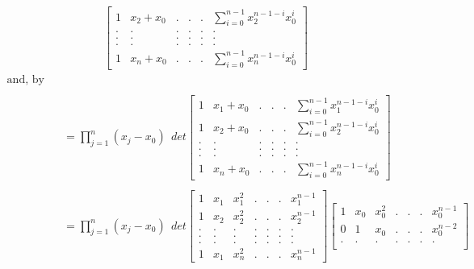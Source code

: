 \documentclass{article}
\begin{document}
\begin{enumerate}
\begin{enumerate}[(a)]
\begin{align*}
\begin{bmatrix}
            1 & x_{2} + x_{0} & . & . & . & \sum_{i=0}^{n-1} x_{2}^{n-1-i} x_{0}^{i}\\
            . & . & . & . & . & .\\
            . & . & . & . & . & .\\
            . & . & . & . & . & .\\
            1 & x_{n} + x_{0} & . & . & . & \sum_{i=0}^{n-1} x_{n}^{n-1-i} x_{0}^{i}
        \end{bmatrix}
    \end{align*}
    \begin{align*}
        \text{and, by Cauchy's Theorem, we get that} \\ \\
        &= \displaystyle \prod_{j=1}^{n} (x_{j} - x_{0}) \ \ det \begin{bmatrix}
            1 & x_{1} + x_{0} & . & . & . & \sum_{i=0}^{n-1} x_{1}^{n-1-i} x_{0}^{i}\\
            1 & x_{2} + x_{0} & . & . & . & \sum_{i=0}^{n-1} x_{2}^{n-1-i} x_{0}^{i}\\
            . & . & . & . & . & .\\
            . & . & . & . & . & .\\
            . & . & . & . & . & .\\
            1 & x_{n} + x_{0} & . & . & . & \sum_{i=0}^{n-1} x_{n}^{n-1-i} x_{0}^{i}
        \end{bmatrix} \\ \\
        &= \displaystyle \prod_{j=1}^{n} (x_{j} - x_{0}) \  \ det \begin{bmatrix}
            1 & x_{1} & x_{1}^{2} & . & . & . & x_{1}^{n-1}\\
            1 & x_{2} & x_{2}^{2} & . & . & . & x_{2}^{n-1}\\
            . & . & . & . & . & . & .\\
            . & . & . & . & . & . & .\\
            . & . & . & . & . & . & .\\
            1 & x_{1} & x_{n}^{2} & . & . & . & x_{n}^{n-1}
        \end{bmatrix}
        \begin{bmatrix}
            1 & x_{0} & x_{0}^{2} & . & . & . & x_{0}^{n-1}\\
            0 & 1 & x_{0} & . & . & . & x_{0}^{n-2}\\
            . & . & . & . & . & . & .\\

\end{bmatrix}
\end{align*}
\end{enumerate}
\end{enumerate}
\end{document}
